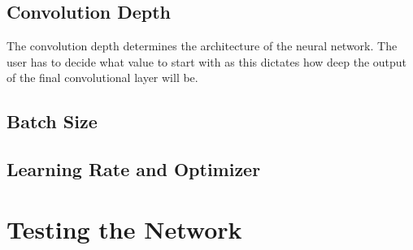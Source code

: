 \subsection{Convolution Depth}
The convolution depth determines the architecture of the neural network. The user has to decide what value to start with as this dictates how deep the output of the final convolutional layer will be.
\subsection{Batch Size}
\subsection{Learning Rate and Optimizer}


\section{Testing the Network}